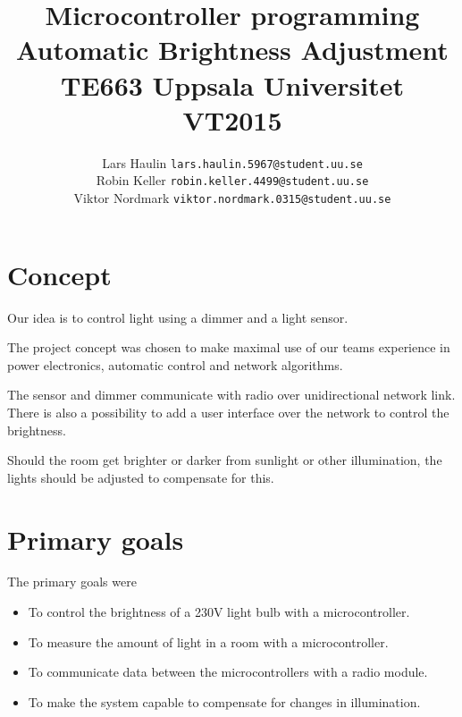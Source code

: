 \documentclass[11pt]{article}
\begin{document}
	\title{Microcontroller programming \\
		Automatic Brightness Adjustment\\
		TE663 Uppsala Universitet VT2015}
	\date{}
	\author{}
	\author{Lars Haulin \texttt{lars.haulin.5967@student.uu.se}\\
		Robin Keller \texttt{robin.keller.4499@student.uu.se}\\
		Viktor Nordmark \texttt{viktor.nordmark.0315@student.uu.se}}
	\maketitle
	

	\section{Concept}
	
	Our idea is to control light using a dimmer and a light sensor.

   The project concept was chosen to make maximal use of our teams experience
   in power electronics, automatic control and network algorithms.

	The sensor and dimmer communicate with radio over unidirectional network link.
	There is also a possibility to add a user interface over the network to control
	the brightness.
	
	Should the room get brighter or darker from sunlight or other illumination,
	the lights should be adjusted to compensate for this.
	
	\section{Primary goals}

   The primary goals were
	
	\begin{itemize}
		\item To control the brightness of a 230V light bulb with a microcontroller.
		\item To measure the amount of light in a room with a microcontroller.
		\item To communicate data between the microcontrollers with a radio module.
		\item To make the system capable to compensate for changes in illumination.
	\end{itemize}
	
\end{document}
